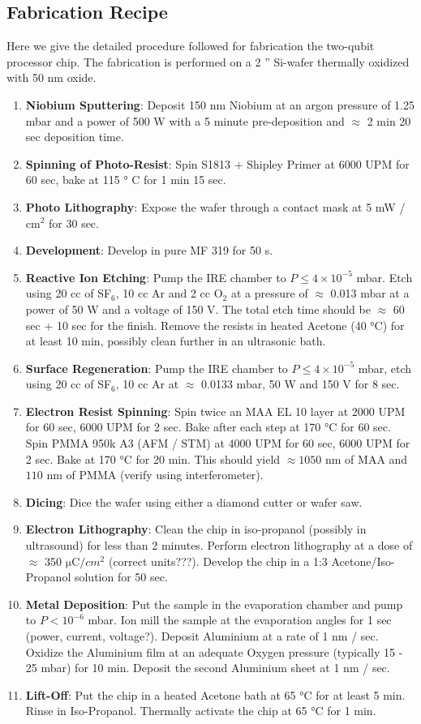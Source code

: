 \subsection{Fabrication Recipe}

Here we give the detailed procedure followed for fabrication the two-qubit processor chip. The fabrication is performed on a 2 '' Si-wafer thermally oxidized with 50 nm oxide.

\begin{enumerate}
\item \textbf{Niobium Sputtering}: Deposit 150 nm Niobium at an argon pressure of 1.25 mbar and a power of 500 W with a 5 minute pre-deposition and $\approx$ 2 min 20 sec deposition time.
\item \textbf{Spinning of Photo-Resist}: Spin S1813 + Shipley Primer at 6000 UPM for 60 sec, bake at 115 ° C for 1 min 15 sec.
\item \textbf{Photo Lithography}: Expose the wafer through a contact mask at 5 mW / cm$^2$ for 30 sec.
\item \textbf{Development}: Develop in pure MF 319 for 50 s.
\item \textbf{Reactive Ion Etching}: Pump the IRE chamber to $P\le 4\times 10^{-5}$ mbar. Etch using 20 cc of SF$_6$, 10 cc Ar and 2 cc O$_2$ at a pressure of $\approx$ 0.013 mbar at a power of 50 W and a voltage of 150 V. The total etch time should be $\approx $ 60 sec + 10 sec for the finish. Remove the resists in heated Acetone (40 °C) for at least 10 min, possibly clean further in an ultrasonic bath.
\item \textbf{Surface Regeneration}: Pump the IRE chamber  to $P\le 4\times 10^{-5}$ mbar, etch using 20 cc of SF$_6$, 10 cc Ar at $\approx$ 0.0133 mbar, 50 W and 150 V for 8 sec.
\item \textbf{Electron Resist Spinning}: Spin twice an MAA EL 10 layer at 2000 UPM for 60 sec, 6000 UPM for 2 sec. Bake after each step at 170 °C for 60 sec. Spin PMMA 950k A3 (AFM / STM) at 4000 UPM for 60 sec, 6000 UPM for 2 sec. Bake at 170 °C for 20 min. This should yield $\approx 1050$ nm of MAA and $110$ nm of PMMA (verify using interferometer).
\item \textbf{Dicing}: Dice the wafer using either a diamond cutter or wafer saw.
\item \textbf{Electron Lithography}: Clean the chip in iso-propanol (possibly in ultrasound) for less than 2 minutes. Perform electron lithography at a dose of $\approx$ 350 $\mathrm{\mu C}/cm^2$ (correct units???). Develop the chip in a 1:3 Acetone/Iso-Propanol solution for 50 sec.
\item \textbf{Metal Deposition}: Put the sample in the evaporation chamber and pump to $P<10^{-6}$ mbar. Ion mill the sample at the evaporation angles for 1 sec (power, current, voltage?). Deposit Aluminium at a rate of 1 nm / sec. Oxidize the Aluminium film at an adequate Oxygen pressure (typically 15 - 25 mbar) for 10 min. Deposit the second Aluminium sheet at 1 nm / sec.
\item \textbf{Lift-Off}: Put the chip in a heated Acetone bath at 65 °C for at least 5 min. Rinse in Iso-Propanol. Thermally activate the chip at 65 °C for 1 min.


\end{enumerate}
